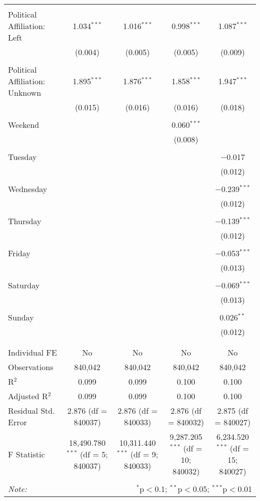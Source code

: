 \documentclass[
]{article}
\begin{document}
\begin{table}[!htbp]
{\begin{tabular}{@{\extracolsep{5pt}}lcccc}
  & & & & \\ 
 Political Affiliation: Left & 1.034$^{***}$ & 1.016$^{***}$ & 0.998$^{***}$ & 1.087$^{***}$ \\ 
  & (0.004) & (0.005) & (0.005) & (0.009) \\ 
  & & & & \\ 
 Political Affiliation: Unknown & 1.895$^{***}$ & 1.876$^{***}$ & 1.858$^{***}$ & 1.947$^{***}$ \\ 
  & (0.015) & (0.016) & (0.016) & (0.018) \\ 
  & & & & \\ 
 Weekend &  &  & 0.060$^{***}$ &  \\ 
  &  &  & (0.008) &  \\ 
  & & & & \\ 
 Tuesday &  &  &  & $-$0.017 \\ 
  &  &  &  & (0.012) \\ 
  & & & & \\ 
 Wednesday &  &  &  & $-$0.239$^{***}$ \\ 
  &  &  &  & (0.012) \\ 
  & & & & \\ 
 Thursday &  &  &  & $-$0.139$^{***}$ \\ 
  &  &  &  & (0.012) \\ 
  & & & & \\ 
 Friday &  &  &  & $-$0.053$^{***}$ \\ 
  &  &  &  & (0.013) \\ 
  & & & & \\ 
 Saturday &  &  &  & $-$0.069$^{***}$ \\ 
  &  &  &  & (0.013) \\ 
  & & & & \\ 
 Sunday &  &  &  & 0.026$^{**}$ \\ 
  &  &  &  & (0.012) \\ 
  & & & & \\ 
\hline \\[-1.8ex] 
Individual FE & No & No & No & No \\ 
Observations & 840,042 & 840,042 & 840,042 & 840,042 \\ 
R$^{2}$ & 0.099 & 0.099 & 0.100 & 0.100 \\ 
Adjusted R$^{2}$ & 0.099 & 0.099 & 0.100 & 0.100 \\ 
Residual Std. Error & 2.876 (df = 840037) & 2.876 (df = 840033) & 2.876 (df = 840032) & 2.875 (df = 840027) \\ 
F Statistic & 18,490.780$^{***}$ (df = 5; 840037) & 10,311.440$^{***}$ (df = 9; 840033) & 9,287.205$^{***}$ (df = 10; 840032) & 6,234.520$^{***}$ (df = 15; 840027) \\ 
\hline 
\hline \\[-1.8ex] 
\textit{Note:}  & \multicolumn{4}{r}{$^{*}$p$<$0.1; $^{**}$p$<$0.05; $^{***}$p$<$0.01} \\ 
\end{tabular}
} 
\end{table} 
\newpage
\end{document}
